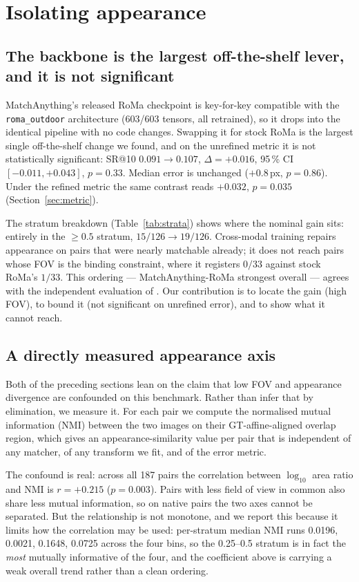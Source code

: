 \documentclass[10pt]{article}
\begin{document}
\section{Isolating appearance}
\label{sec:appearance}

\subsection{The backbone is the largest off-the-shelf lever, and it is not significant}

MatchAnything's released RoMa checkpoint is key-for-key compatible with the \texttt{roma\_outdoor} architecture (603/603 tensors, all retrained), so it drops into the identical pipeline with no code changes. Swapping it for stock RoMa is the largest single off-the-shelf change we found, and on the unrefined metric it is not statistically significant: SR@10 $0.091\rightarrow0.107$, $\Delta=+0.016$, 95\,\% CI $[-0.011,+0.043]$, $p=0.33$. Median error is unchanged ($+0.8$\,px, $p=0.86$). Under the refined metric the same contrast reads $+0.032$, $p=0.035$ (Section~\ref{sec:metric}).

The stratum breakdown (Table~\ref{tab:strata}) shows where the nominal gain sits: entirely in the ${\ge}0.5$ stratum, $15/126\rightarrow19/126$. Cross-modal training repairs appearance on pairs that were nearly matchable already; it does not reach pairs whose FOV is the binding constraint, where it registers $0/33$ against stock RoMa's $1/33$. This ordering --- MatchAnything-RoMa strongest overall --- agrees with the independent evaluation of \citet{durmaz2026foundation}. Our contribution is to locate the gain (high FOV), to bound it (not significant on unrefined error), and to show what it cannot reach.

\subsection{A directly measured appearance axis}

Both of the preceding sections lean on the claim that low FOV and appearance divergence are confounded on this benchmark. Rather than infer that by elimination, we measure it. For each pair we compute the normalised mutual information (NMI) between the two images on their GT-affine-aligned overlap region, which gives an appearance-similarity value per pair that is independent of any matcher, of any transform we fit, and of the error metric.

The confound is real: across all 187 pairs the correlation between $\log_{10}$ area ratio and NMI is $r=+0.215$ ($p=0.003$). Pairs with less field of view in common also share less mutual information, so on native pairs the two axes cannot be separated. But the relationship is not monotone, and we report this because it limits how the correlation may be used: per-stratum median NMI runs 0.0196, 0.0021, 0.1648, 0.0725 across the four bins, so the 0.25--0.5 stratum is in fact the \emph{most} mutually informative of the four, and the coefficient above is carrying a weak overall trend rather than a clean ordering.
\end{document}
